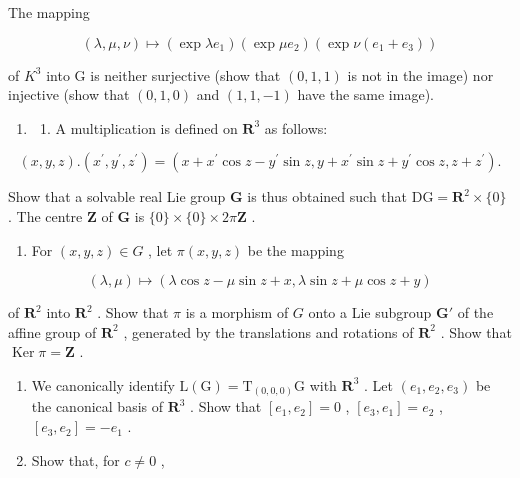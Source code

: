 The mapping

\[
(\lambda , \mu , \nu) \mapsto (\exp \lambda e _ {1}) (\exp \mu e _ {2}) (\exp \nu (e _ {1} + e _ {3}))
\]

of \(K^{3}\) into G is neither surjective (show that \((0,1,1)\) is not in the image) nor injective (show that \((0,1,0)\) and \((1,1,-1)\) have the same image).

\begin{enumerate}
\def\labelenumi{\arabic{enumi}.}
\setcounter{enumi}{12}
\tightlist
\item
  \begin{enumerate}
  \def\labelenumii{(\alph{enumii})}
  \tightlist
  \item
    A multiplication is defined on \(\mathbf{R}^3\) as follows:
  \end{enumerate}
\end{enumerate}

\[
(x, y, z). (x ^ {\prime}, y ^ {\prime}, z ^ {\prime}) = (x + x ^ {\prime} \cos z - y ^ {\prime} \sin z, y + x ^ {\prime} \sin z + y ^ {\prime} \cos z, z + z ^ {\prime}).
\]

Show that a solvable real Lie group \(\mathbf{G}\) is thus obtained such that \(\mathrm{DG} = \mathbf{R}^2\times \{0\}\) . The centre \(\mathbf{Z}\) of \(\mathbf{G}\) is \(\{0\} \times \{0\} \times 2\pi \mathbf{Z}\) .

\begin{enumerate}
\def\labelenumi{(\alph{enumi})}
\setcounter{enumi}{1}
\tightlist
\item
  For \((x,y,z)\in G\) , let \(\pi (x,y,z)\) be the mapping
\end{enumerate}

\[
(\lambda , \mu) \mapsto (\lambda \cos z - \mu \sin z + x, \lambda \sin z + \mu \cos z + y)
\]

of \(\mathbf{R}^2\) into \(\mathbf{R}^2\) . Show that \(\pi\) is a morphism of \(G\) onto a Lie subgroup \(\mathbf{G}'\) of the affine group of \(\mathbf{R}^2\) , generated by the translations and rotations of \(\mathbf{R}^2\) . Show that \(\operatorname{Ker} \pi = \mathbf{Z}\) .

\begin{enumerate}
\def\labelenumi{(\alph{enumi})}
\setcounter{enumi}{2}
\item
  We canonically identify \(\mathrm{L}(\mathrm{G}) = \mathrm{T}_{(0,0,0)}\mathrm{G}\) with \(\mathbf{R}^3\) . Let \((e_1, e_2, e_3)\) be the canonical basis of \(\mathbf{R}^3\) . Show that \([e_1, e_2] = 0\) , \([e_3, e_1] = e_2\) , \([e_3, e_2] = -e_1\) .
\item
  Show that, for \(c \neq 0\) ,
\end{enumerate}

